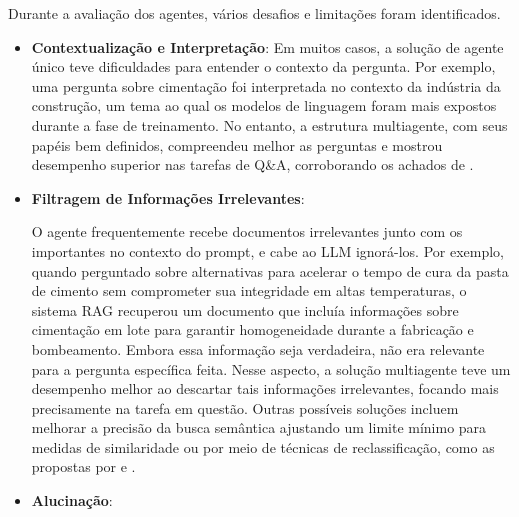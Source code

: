            Durante a avaliação dos agentes, vários desafios e limitações foram identificados.
            
            \begin{itemize}
                \item \textbf{Contextualização e Interpretação}: 
                    Em muitos casos, a solução de agente único teve dificuldades para entender o contexto da pergunta. Por exemplo, uma pergunta sobre cimentação foi interpretada no contexto da indústria da construção, um tema ao qual os modelos de linguagem foram mais expostos durante a fase de treinamento. No entanto, a estrutura multiagente, com seus papéis bem definidos, compreendeu melhor as perguntas e mostrou desempenho superior nas tarefas de Q\&A, corroborando os achados de \cite{Li2024}.
    
                
                \item \textbf{Filtragem de Informações Irrelevantes}: 
                
                    O agente frequentemente recebe documentos irrelevantes junto com os importantes no contexto do prompt, e cabe ao LLM ignorá-los. Por exemplo, quando perguntado sobre alternativas para acelerar o tempo de cura da pasta de cimento sem comprometer sua integridade em altas temperaturas, o sistema RAG recuperou um documento que incluía informações sobre cimentação em lote para garantir homogeneidade durante a fabricação e bombeamento. Embora essa informação seja verdadeira, não era relevante para a pergunta específica feita. Nesse aspecto, a solução multiagente teve um desempenho melhor ao descartar tais informações irrelevantes, focando mais precisamente na tarefa em questão. Outras possíveis soluções incluem melhorar a precisão da busca semântica ajustando um limite mínimo para medidas de similaridade ou por meio de técnicas de reclassificação, como as propostas por \cite{Carraro2024} e \cite{Sun2023}.
                
            
                \item \textbf{Alucinação}: 
                

\end{itemize}
